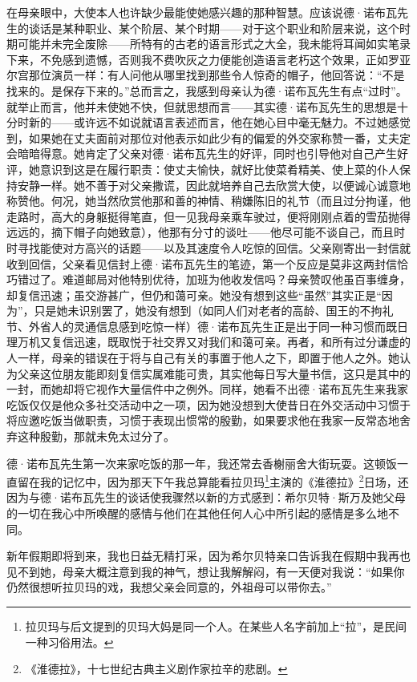 \par 在母亲眼中，大使本人也许缺少最能使她感兴趣的那种智慧。应该说德·诺布瓦先生的谈话是某种职业、某个阶层、某个时期——对于这个职业和阶层来说，这个时期可能并未完全废除——所特有的古老的语言形式之大全，我未能将耳闻如实笔录下来，不免感到遗憾，否则我不费吹灰之力便能创造语言老朽这个效果，正如罗亚尔宫那位演员一样：有人问他从哪里找到那些令人惊奇的帽子，他回答说：“不是找来的。是保存下来的。”总而言之，我感到母亲认为德·诺布瓦先生有点“过时”。就举止而言，他并未使她不快，但就思想而言——其实德·诺布瓦先生的思想是十分时新的——或许远不如说就语言表述而言，他在她心目中毫无魅力。不过她感觉到，如果她在丈夫面前对那位对他表示如此少有的偏爱的外交家称赞一番，丈夫定会暗暗得意。她肯定了父亲对德·诺布瓦先生的好评，同时也引导他对自己产生好评，她意识到这是在履行职责：使丈夫愉快，就好比使菜肴精美、使上菜的仆人保持安静一样。她不善于对父亲撒谎，因此就培养自己去欣赏大使，以便诚心诚意地称赞他。何况，她当然欣赏他那和善的神情、稍嫌陈旧的礼节（而且过分拘谨，他走路时，高大的身躯挺得笔直，但一见我母亲乘车驶过，便将刚刚点着的雪茄抛得远远的，摘下帽子向她致意），他那有分寸的谈吐——他尽可能不谈自己，而且时时寻找能使对方高兴的话题——以及其速度令人吃惊的回信。父亲刚寄出一封信就收到回信，父亲看见信封上德·诺布瓦先生的笔迹，第一个反应是莫非这两封信恰巧错过了。难道邮局对他特别优待，加班为他收发信吗？母亲赞叹他虽百事缠身，却复信迅速；虽交游甚广，但仍和蔼可亲。她没有想到这些“虽然”其实正是“因为”，只是她未识别罢了，她没有想到（如同人们对老者的高龄、国王的不拘礼节、外省人的灵通信息感到吃惊一样）德·诺布瓦先生正是出于同一种习惯而既日理万机又复信迅速，既取悦于社交界又对我们和蔼可亲。再者，和所有过分谦虚的人一样，母亲的错误在于将与自己有关的事置于他人之下，即置于他人之外。她认为父亲这位朋友能即刻复信实属难能可贵，其实他每日写大量书信，这只是其中的一封，而她却将它视作大量信件中之例外。同样，她看不出德·诺布瓦先生来我家吃饭仅仅是他众多社交活动中之一项，因为她没想到大使昔日在外交活动中习惯于将应邀吃饭当做职责，习惯于表现出惯常的殷勤，如果要求他在我家一反常态地舍弃这种殷勤，那就未免太过分了。
\par 德·诺布瓦先生第一次来家吃饭的那一年，我还常去香榭丽舍大街玩耍。这顿饭一直留在我的记忆中，因为那天下午我总算能看拉贝玛\footnote{拉贝玛与后文提到的贝玛大妈是同一个人。在某些人名字前加上“拉”，是民间一种习俗用法。}主演的《淮德拉》\footnote{《淮德拉》，十七世纪古典主义剧作家拉辛的悲剧。}日场，还因为与德·诺布瓦先生的谈话使我骤然以新的方式感到：希尔贝特·斯万及她父母的一切在我心中所唤醒的感情与他们在其他任何人心中所引起的感情是多么地不同。
\par 新年假期即将到来，我也日益无精打采，因为希尔贝特亲口告诉我在假期中我再也见不到她，母亲大概注意到我的神气，想让我解解闷，有一天便对我说：“如果你仍然很想听拉贝玛的戏，我想父亲会同意的，外祖母可以带你去。”
